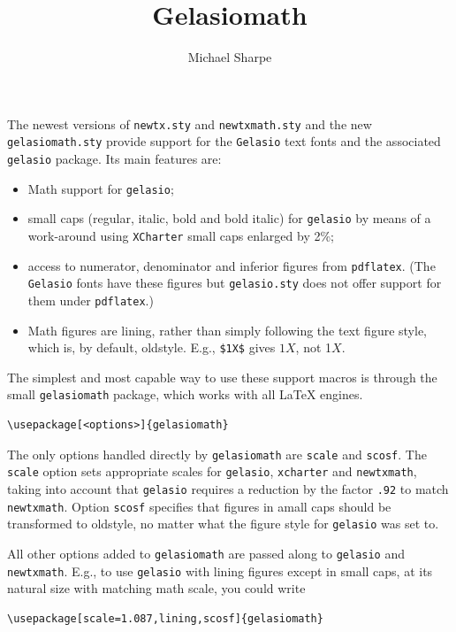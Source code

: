 \documentclass[11pt]{article}
\title{Gelasiomath}
\author{Michael Sharpe}
\begin{document}
\maketitle
The newest versions of {\tt newtx.sty} and {\tt newtxmath.sty} 
and the new {\tt gelasiomath.sty} 
provide  support for the {\tt Gelasio} text fonts and the associated {\tt gelasio} package. Its main features are:
\begin{itemize}
\item
Math support for {\tt gelasio};
\item small caps (regular, italic, bold and bold italic) for {\tt gelasio} by means of a work-around using {\tt XCharter} small caps enlarged by 2\%;
\item access to numerator, denominator and inferior figures from {\tt pdflatex}. (The {\tt Gelasio}  fonts have these figures but {\tt gelasio.sty} does not offer support for them under {\tt pdflatex}.)
\item
Math figures are lining, rather than simply following the text figure style, which is, by default, oldstyle. E.g., \verb|$1X$| gives $1X$, not 1$X$.
\end{itemize}

The simplest and most capable way to use these support macros is through the small {\tt gelasiomath} package, which works with all LaTeX engines.
\begin{verbatim}
\usepackage[<options>]{gelasiomath}
\end{verbatim}
The only options handled directly by {\tt gelasiomath} are {\tt scale} and {\tt scosf}. The {\tt scale} option  sets appropriate scales for {\tt gelasio}, {\tt xcharter} and {\tt newtxmath}, taking into account that {\tt gelasio} requires a reduction by the factor {\tt.92} to match {\tt newtxmath}. Option {\tt scosf} specifies that figures in amall caps should be transformed to oldstyle, no matter what the figure style for {\tt gelasio} was set to.

All other options added to {\tt gelasiomath} are passed along to {\tt gelasio} and {\tt newtxmath}.
E.g., to use {\tt gelasio} with lining figures except in small caps, at its natural size with matching math scale, you could write
\begin{verbatim}
\usepackage[scale=1.087,lining,scosf]{gelasiomath}
\end{verbatim}

\end{document}
